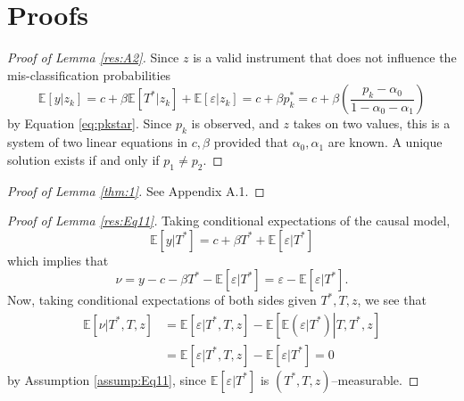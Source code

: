 \section{Proofs}

\begin{proof}[Proof of Lemma \ref{res:A2}]
Since $z$ is a valid instrument that does not influence the mis-classification probabilities
\[\mathbb{E}[y|z_k] = c + \beta \mathbb{E}[T^*|z_k] + \mathbb{E}[\varepsilon|z_k] = c + \beta p_k^* = c + \beta \left( \frac{p_k - \alpha_0}{1 - \alpha_0 - \alpha_1} \right)\]
by Equation \ref{eq:pkstar}.
Since $p_k$ is observed, and $z$ takes on two values, this is a system of two linear equations in $c,\beta$ provided that $\alpha_0,\alpha_1$ are known.
A unique solution exists if and only if $p_1 \neq p_2$.
\end{proof}

\begin{proof}[Proof of Lemma \ref{thm:1}]
  See \cite{Mahajan} Appendix A.1. 
\end{proof}

\begin{proof}[Proof of Lemma \ref{res:Eq11}]
  Taking conditional expectations of the causal model,
  \[\mathbb{E}[y|T^*] = c + \beta T^* + \mathbb{E}[\varepsilon|T^*]\]
  which implies that 
  \[\nu = y - c - \beta T^* - \mathbb{E}[\varepsilon|T^*] = \varepsilon - \mathbb{E}[\varepsilon|T^*].\]
  Now, taking conditional expectations of both sides given $T^*,T,z$, we see that 
  \begin{align*}
  \mathbb{E}[\nu|T^*,T,z]&= \mathbb{E}[\varepsilon|T^*,T,z] - \mathbb{E}\left[ \mathbb{E}\left( \left.\varepsilon\right|T^* \right)\left. \right| T,T^*,z \right]\\
  &= \mathbb{E}[\varepsilon|T^*,T,z] - \mathbb{E}\left[ \left.\varepsilon\right|T^* \right] = 0
\end{align*}
by Assumption \ref{assump:Eq11}, since $\mathbb{E}[\varepsilon|T^*]$ is $(T^*,T,z)$--measurable.
\end{proof}

